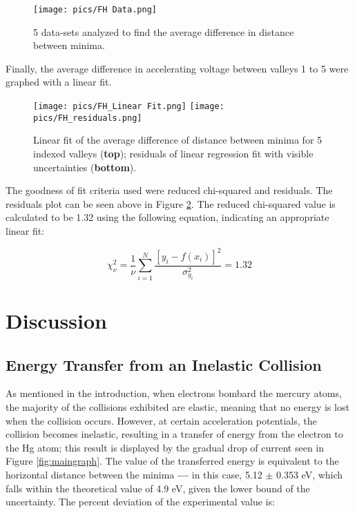 \documentclass[12pt, letterpaper, twoside]{article}
\begin{document}
\begin{figure}[!ht]
    \centering
    \texttt{[image: pics/FH Data.png]}
    \caption{5 data-sets analyzed to find the average difference in distance between minima.}
    \label{fig:rawdata}
\end{figure}

Finally, the average difference in accelerating voltage between valleys 1 to 5 were graphed with a linear fit. 

\begin{figure}[!ht]
    \centering
    \texttt{[image: pics/FH\_Linear Fit.png]}
    \texttt{[image: pics/FH\_residuals.png]}
    \caption{Linear fit of the average difference of distance between minima for 5 indexed valleys (\textbf{top}); residuals of linear regression fit with visible uncertainties (\textbf{bottom}).}
    \label{fig:data}
\end{figure}

The goodness of fit criteria used were reduced chi-squared and residuals. The residuals plot can be seen above in Figure \ref{fig:data}. The reduced chi-squared value is calculated to be 1.32 using the following equation, indicating an appropriate linear fit:

\begin{equation}
    \chi_{\nu}^2 = \frac{1}{\nu}\sum_{i=1}^N\frac{[y_i - f(x_i)]^2}{\sigma_{y_i}^2} = 1.32 \label{chisq} 
\end{equation}

\section{Discussion}

\subsection{Energy Transfer from an Inelastic Collision}

As mentioned in the introduction, when electrons bombard the mercury atoms, the majority of the collisions exhibited are elastic, meaning that no energy is lost when the collision occurs. However, at certain acceleration potentials, the collision becomes inelastic, resulting in a transfer of energy from the electron to the Hg atom; this result is displayed by the gradual drop of current seen in Figure \ref{fig:maingraph}. The value of the transferred energy is equivalent to the horizontal distance between the minima \textbf{---} in this case, 5.12 $\pm$ 0.353 eV, which falls within the theoretical value of 4.9 eV, given the lower bound of the uncertainty. The percent deviation of the experimental value is:
\end{document}
